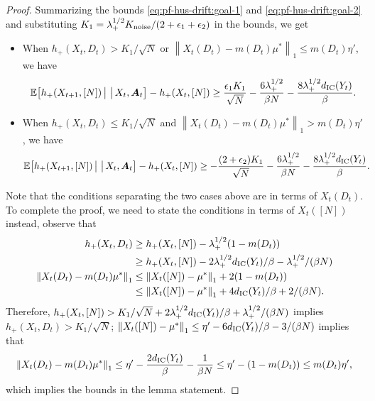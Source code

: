 \documentclass[11pt,letterpaper]{article}
\theoremstyle{plain}
\theoremstyle{definition}
\theoremstyle{remark}
\newcommand{\norm}[1]{\left\lVert#1\right\rVert}
\newcommand{\Ebig}[1]{\mathbb{E}\big[#1\big]}
\newcommand{\givenbig}{\,\big|\,}
\newcommand{\ve}[1]{\bm{#1}}
\newcommand{\veA}{\ve{A}}
\newcommand{\statdist}{\mu^*}
\newcommand{\disy}{d_{\textup{IC}}}
\newcommand{\gapus}{\epsilon_1} %
\newcommand{\gapusmax}{\epsilon_2}
\newcommand{\radiusus}{\eta'}
\newcommand{\noiseortho}{K_{\textup{noise}}}
\newcommand{\subus}{+}%
\newcommand{\hus}{h_{\subus}}
\newcommand{\lamus}{\lambda_{\subus}}
\begin{document}
\begin{proof}
    Summarizing the bounds \eqref{eq:pf-hus-drift:goal-1} and \eqref{eq:pf-hus-drift:goal-2} and substituting $K_1 = \lamus^{1/2} \noiseortho / (2+\gapus+\gapusmax)$ in the bounds, we get
    \begin{itemize}[leftmargin=1em]
        \item When $\hus(X_t, D_t) > K_1 / \sqrt{N}$ or $\norm{X_t(D_t) - m(D_t)\statdist}_1 \leq m(D_t) \radiusus$, we have 
        \begin{equation}
            \label{eq:pf-hus-drift:case-1-2}
             \Ebig{\hus(X_{t+1}, [N]) \givenbig \givenbig X_t, \veA_t} - \hus(X_t, [N]) \geq \frac{\gapus K_1}{\sqrt{N}} - \frac{6\lamus^{1/2}}{\beta N} -  \frac{8 \lamus^{1/2} \disy(Y_t)}{\beta}. 
        \end{equation}
        \item When $\hus(X_t, D_t) \leq K_1 / \sqrt{N}$ and $\norm{X_t(D_t) - m(D_t)\statdist}_1 > m(D_t) \radiusus$, we have
        \begin{align}
            \Ebig{\hus(X_{t+1}, [N]) \givenbig \givenbig X_t, \veA_t} - \hus(X_t, [N]) 
            \label{eq:pf-hus-drift:case-3}
            &\geq -  \frac{(2+\gapusmax)K_1}{\sqrt{N}} - \frac{6\lamus^{1/2}}{\beta N} -  \frac{8 \lamus^{1/2} \disy(Y_t)}{\beta}.
        \end{align}
    \end{itemize}
    
    Note that the conditions separating the two cases above are in terms of $X_t(D_t)$. To complete the proof, we need to state the conditions in terms of $X_t([N])$ instead, observe that 
    \begin{align*}
        \hus(X_t, D_t) 
        &\geq \hus(X_t, [N]) - \lamus^{1/2} (1-m(D_t)) \\
        &\geq  \hus(X_t, [N]) - 2\lamus^{1/2} \disy(Y_t) / \beta - \lamus^{1/2}/(\beta N) \\
        \norm{X_t(D_t) - m(D_t)\statdist}_1 
        &\leq \norm{X_t([N]) - \statdist}_1 + 2(1-m(D_t)) \\
        &\leq \norm{X_t([N]) - \statdist}_1 + 4\disy(Y_t)/\beta + 2/(\beta N).
    \end{align*}
    Therefore, $\hus(X_t, [N]) > K_1 / \sqrt{N} + 2\lamus^{1/2} \disy(Y_t) / \beta + \lamus^{1/2}/(\beta N)$ implies $\hus(X_t, D_t) > K_1 / \sqrt{N}$; $\norm{X_t([N]) - \statdist}_1 \leq \radiusus -  6\disy(Y_t)/\beta - 3/(\beta N)$ implies that 
    \[
        \norm{X_t(D_t) - m(D_t)\statdist}_1 \leq \radiusus - \frac{2\disy(Y_t)}{\beta} - \frac{1}{\beta N}  \leq \radiusus - (1-m(D_t)) \leq m(D_t) \radiusus, 
    \]
    which implies the bounds in the lemma statement. 
\end{proof}
\end{document}
